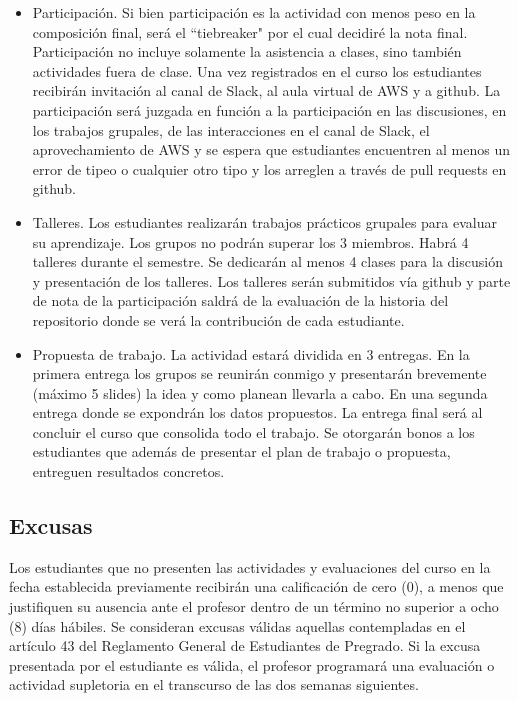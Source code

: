 \documentclass[11pt]{article}
\begin{document}
\begin{itemize}


\item Participación. Si bien participación es la actividad con menos peso en la composición final, será el “tiebreaker" por el cual decidiré la nota final. Participación no incluye solamente la asistencia a clases, sino también actividades fuera de clase. Una vez registrados en el curso los estudiantes recibirán invitación al canal de Slack, al aula virtual de AWS y a github. La participación será juzgada en función a la participación en las discusiones, en los trabajos grupales, de las interacciones en el canal de Slack, el aprovechamiento de AWS y se espera que estudiantes encuentren al menos un error de tipeo o cualquier otro tipo y los arreglen a través de pull requests en github.

\item Talleres. Los estudiantes realizarán trabajos prácticos grupales para evaluar su aprendizaje. Los grupos no podrán superar los 3 miembros. Habrá 4 talleres durante el semestre. Se dedicarán al menos 4 clases para la discusión y presentación de los talleres. Los talleres serán submitidos vía github y parte de nota de la participación saldrá de la evaluación de la historia del repositorio donde se verá la contribución de cada estudiante.

\item Propuesta de trabajo.  La actividad estará dividida en 3 entregas. En la primera entrega los grupos se reunirán conmigo y presentarán brevemente (máximo 5 slides) la idea y como planean llevarla a cabo. En una segunda entrega donde se expondrán los datos propuestos. La entrega final será al concluir el curso que consolida todo el trabajo. Se otorgarán bonos a los estudiantes que además de presentar el plan de trabajo o propuesta, entreguen resultados concretos.
\end{itemize}





\subsection*{Excusas}

Los estudiantes que no presenten las actividades y evaluaciones del curso en la fecha establecida previamente recibirán una calificación de cero (0), a menos que justifiquen su ausencia ante el profesor dentro de un término no superior a ocho (8) días hábiles. Se consideran excusas válidas aquellas contempladas en el artículo 43 del Reglamento General de Estudiantes de Pregrado. Si la excusa presentada por el estudiante es válida, el profesor programará una evaluación o actividad supletoria en el transcurso de las dos semanas siguientes.
\end{document}
